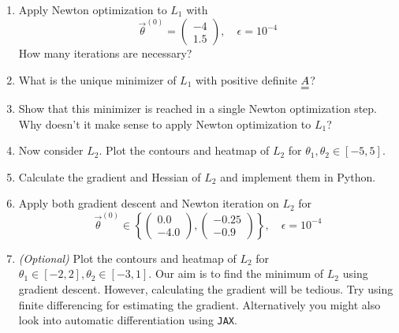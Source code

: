 \begin{enumerate}
        \begin{itemize}
            \item the starting point $\vec{\theta}^{(0)}$
            \item the objective function $L(\vec{\theta})$
            \item its gradient function $\vec{\nabla} L(\vec{\theta}) \in \mathbb{R}^p$
            \item its Hessian function $\mat{H}_L(\vec{\theta}) \in \mathbb{R}^{(p \times p)}$
            \item the tolerance $\epsilon$
            \item and the maximum number of iterations $N_{\text{max}}$
        \end{itemize}

        and should return all iteration steps.
        \item Apply Newton optimization to $L_1$ with 
        \begin{equation}
            \vec{\theta}^{(0)} = \begin{pmatrix}
            -4 \\ 1.5
        \end{pmatrix}, \quad \epsilon = 10^{-4}
        \end{equation}
        How many iterations are necessary?
        \item What is the unique minimizer of $L_1$ with positive definite $\mat{A}$?
        \item Show that this minimizer is reached in a single Newton optimization step. Why doesn't 
        it make sense to apply Newton optimization to $L_1$?
        \item Now consider $L_2$. Plot the contours and heatmap of $L_2$ for $\theta_1,\theta_2 \in [-5,5]$.
        \item Calculate the gradient and Hessian of $L_2$ and implement them in Python.
        \item Apply both gradient descent and Newton iteration on $L_2$ for
        \begin{equation}
            \vec{\theta}^{(0)} \in \left\{\begin{pmatrix} 0.0 \\ -4.0 \end{pmatrix}, \begin{pmatrix} -0.25 \\ -0.9 \end{pmatrix} \right\}, \quad \epsilon = 10^{-4}
        \end{equation}
        \item \textit{(Optional)} Plot the contours and heatmap of $L_2$ for $\theta_1 \in [-2,2], \theta_2 \in [-3,1]$.
        Our aim is to find the minimum of $L_2$ using gradient descent. However, calculating the 
        gradient will be tedious. Try using finite differencing for estimating the gradient.
        Alternatively you might also look into automatic differentiation using \texttt{JAX}.
    \end{enumerate}


\pagebreak